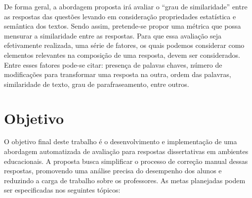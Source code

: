 De forma geral, a abordagem proposta irá avaliar o ``grau de similaridade'' entre as respostas das questões levando em consideração propriedades estatística e semântica dos textos. Sendo assim, pretende-se propor uma métrica que possa mensurar a similaridade entre as respostas.  Para que essa avaliação seja efetivamente realizada, uma série de fatores, os quais podemos considerar como elementos relevantes na composição de uma resposta, devem ser considerados. Entre esses fatores pode-se citar: presença de palavas chaves, número de modificações para transformar uma resposta na outra, ordem das palavras, similaridade de texto, grau de parafraseamento, entre outros.



\section{Objetivo}

O objetivo final deste trabalho é o desenvolvimento e implementação de uma abordagem automatizada de avaliação para respostas dissertativas em ambientes educacionais. A proposta busca simplificar o processo de correção manual dessas respostas, promovendo uma análise precisa do desempenho dos alunos e reduzindo a carga de trabalho sobre os professores. As metas planejadas podem ser especificadas nos seguintes tópicos:

